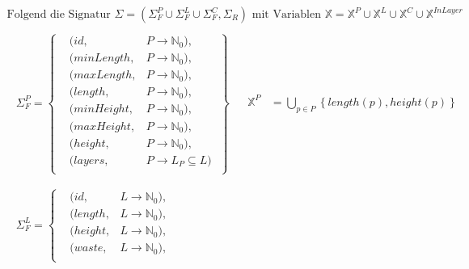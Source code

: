 \[
    \begin{aligned}
        \text{Folgend die Signatur } \Sigma = \left( \Sigma_{F}^{P} \cup \Sigma_{F}^{L} \cup \Sigma_{F}^{C}, \Sigma_{R} \right) \text{ mit Variablen } \mathbb{X} = \mathbb{X}^{P} \cup \mathbb{X}^{L} \cup \mathbb{X}^{C} \cup \mathbb{X}^{InLayer}  \\[5pt]
            \begin{array}{ll}
                \begin{aligned}
                    \Sigma_{F}^{P} = \left\{
                    \begin{aligned}
                        & (id, & P \rightarrow \mathbb{N}_0), \\
                        & (minLength, & P \rightarrow \mathbb{N}_0), \\
                        & (maxLength, & P \rightarrow \mathbb{N}_0), \\
                        & (length, & P \rightarrow \mathbb{N}_0), \\
                        & (minHeight, & P \rightarrow \mathbb{N}_0), \\
                        & (maxHeight, & P \rightarrow \mathbb{N}_0), \\
                        & (height, & P \rightarrow \mathbb{N}_0), \\
                        & (layers, & P \rightarrow L_P \subseteq L)\; \\
                    \end{aligned} \right\} \\[5pt]
                \end{aligned}
                &
                \begin{aligned}
                    \mathbb{X}^{P} &= \bigcup_{p \in P} \left\{length(p), height(p) \right\} \\
                \end{aligned}
                \\
                \begin{aligned}
                    \Sigma_{F}^{L} = \left\{
                    \begin{aligned}
                        & (id, & L \rightarrow \mathbb{N}_0), \\
                        & (length, & L \rightarrow \mathbb{N}_0), \\
                        & (height, & L \rightarrow \mathbb{N}_0), \\
                        & (waste, & L \rightarrow \mathbb{N}_0), \\

\end{aligned}
\end{aligned}
\end{array}
\end{aligned}\]
